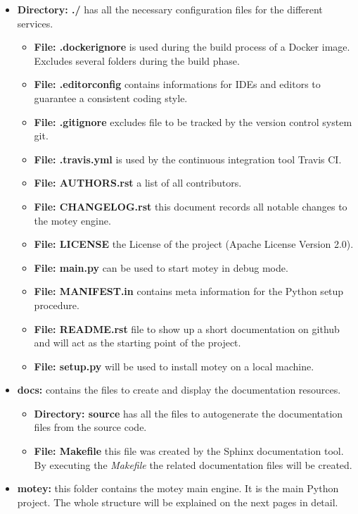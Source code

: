 \begin{itemize}
  \item{\textbf{Directory: ./}} has all the necessary configuration files for the different services.
  \begin{itemize}
    \item{\textbf{File: .dockerignore}} is used during the build process of a Docker image. Excludes several folders during the build phase.
    \item{\textbf{File: .editorconfig}} contains informations for \acp{IDE} and editors to guarantee a consistent coding style.
    \item{\textbf{File: .gitignore}} excludes file to be tracked by the version control system git.
    \item{\textbf{File: .travis.yml}} is used by the continuous integration tool Travis CI.
    \item{\textbf{File: AUTHORS.rst}} a list of all contributors.
    \item{\textbf{File: CHANGELOG.rst}} this document records all notable changes to the motey engine.
    \item{\textbf{File: LICENSE}} the License of the project (Apache License Version 2.0).
    \item{\textbf{File: main.py}} can be used to start motey in debug mode.
    \item{\textbf{File: MANIFEST.in}} contains meta information for the Python setup procedure.
    \item{\textbf{File: README.rst}} file to show up a short documentation on github and will act as the starting point of the project.
    \item{\textbf{File: setup.py}} will be used to install motey on a local machine.
  \end{itemize}
  \item{\textbf{docs:}} contains the files to create and display the documentation resources.
  \begin{itemize}
    \item{\textbf{Directory: source}} has all the files to autogenerate the documentation files from the source code.
    \item{\textbf{File: Makefile}} this file was created by the Sphinx documentation tool. By executing the \textit{Makefile} the related documentation files will be created.
  \end{itemize}
  \item{\textbf{motey:}} this folder contains the motey main engine. It is the main Python project. The whole structure will be explained on the next pages in detail.

\end{itemize}
